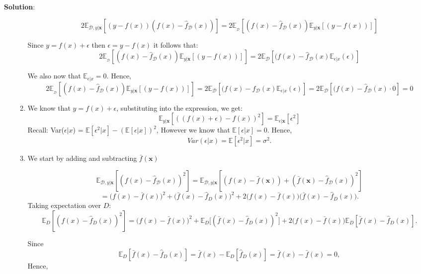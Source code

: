 \documentclass[submit]{harvardml}
\newenvironment{solution}{
    \vspace{2mm}
    \color{blue}\noindent\textbf{Solution}:
}{}
\begin{document}
\begin{solution}
\begin{enumerate}
\begin{enumerate}
            \[
            2 \mathbb{E}_{\mathcal{D}, y|\mathbf{x}}[(y-f(x))(f(x) - \hat f_\mathcal{D}(x))] =2 \mathbb{E}_{ _\mathcal{D}}[(f(x) - \hat f_\mathcal{D}(x))\mathbb{E}_{y|\mathbf{x}}[(y-f(x))]]
            \]
            \medskip
            
            Since $y = f(x) +\epsilon$ then $\epsilon  =  y- f(x)$ it follows that:
            \[
                    2 \mathbb{E}_{ _\mathcal{D}}[(f(x) - \hat f_\mathcal{D}(x))\mathbb{E}_{y|\mathbf{x}}[(y-f(x))]] = 2\mathbb{E}_{\mathcal{D}}[(f(x)-\hat{f}_\mathcal{D}(x)\mathbb{E}_{\epsilon|x}(\epsilon)]
            \]

            We also now that $\mathbb{E}_{\epsilon|x} =0$. Hence,
            \[
            2 \mathbb{E}_{ _\mathcal{D}}[(f(x) - \hat f_\mathcal{D}(x))\mathbb{E}_{y|\mathbf{x}}[(y-f(x))]] = 2\mathbb{E}_{\mathcal{D}}[(f(x)-\hat{f}_\mathcal{D}(x)\mathbb{E}_{\epsilon|x}(\epsilon)] =2\mathbb{E}_{\mathcal{D}}[(f(x)-\hat{f}_\mathcal{D}(x) \cdot 0] = 0
            \]

            \item We know that $y = f(x) +\epsilon$, substituting into the expression, we get:
            \[
            \mathbb{E}_{y|\mathbf{x}}[((f(x) +\epsilon)-f(x))^2]  =\mathbb{E}_{\epsilon|\mathbf{x}}[\epsilon^2]
            \]
            Recall: Var($\epsilon | x$) = $\mathbb{E}[\epsilon^2 |x] - (\mathbb{E}[\epsilon | x])^2$, However we know that $\mathbb{E}[\epsilon |x]=0$. Hence,
            \[
            Var(\epsilon|x)= \mathbb{E}[\epsilon^2 |x] = \sigma^2.
            \]
            \item We start by adding and subtracting $\bar f(\mathbf{x})$

            \[
            \mathbb{E}_{\mathcal{D}, y|\mathbf{x}}[(f(x) - \hat f_\mathcal{D}(x))^2] =   \mathbb{E}_{\mathcal{D}, y|\mathbf{x}}[(f(x) -\bar f(\mathbf{x})) + (\bar f(\mathbf{x}) - \hat f_\mathcal{D}(x))^2]
            \]
            \[
            =
            \big(f(x) - \bar f(x)\big)^2
            +\big(\bar f(x) - \hat f_D(x)\big)^2
            +2\big(f(x) - \bar f(x)\big)\big(\bar f(x) - \hat f_D(x)\big).
            \]
            Taking expectation over $D$:
            \[
            \mathbb{E}_D[(f(x) - \hat f_D(x))^2]
            = \big(f(x) - \bar f(x)\big)^2
            + \mathbb{E}_D\big[(\bar f(x) - \hat f_D(x))^2\big]
            +2\big(f(x) - \bar f(x)\big)
            \mathbb{E}_D[\bar f(x) - \hat f_D(x)].
            \]
            
            Since
            \[
            \mathbb{E}_D[\bar f(x) - \hat f_D(x)]
            =
            \bar f(x) - \mathbb{E}_D[\hat f_D(x)]
            =
            \bar f(x) - \bar f(x)
            =
            0,
            \]
        Hence,


\end{enumerate}
\end{enumerate}
\end{solution}
\end{document}
